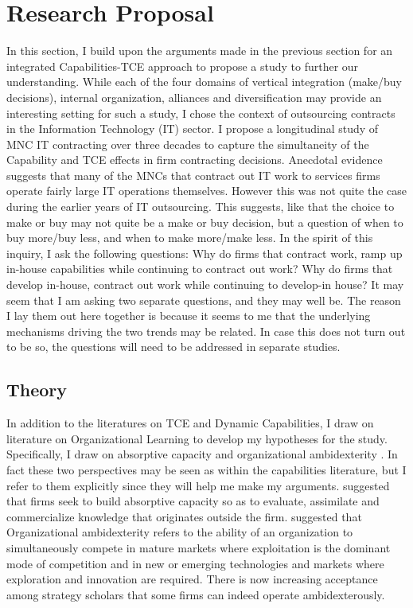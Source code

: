\documentclass[12pt,letterpaper]{article}
\begin{document}
\section{Research Proposal}
In this section, I build upon the arguments made in the previous section for an integrated Capabilities-TCE approach to propose a study to further our understanding. While each of the four domains of vertical integration (make/buy decisions), internal organization, alliances and diversification may provide an interesting setting for such a study, I chose the context of outsourcing contracts in the Information Technology (IT) sector. I propose a longitudinal study of MNC IT contracting over three decades to capture the simultaneity of the Capability and TCE effects in firm contracting decisions. Anecdotal evidence suggests that many of the MNCs that contract out IT work to services firms operate fairly large IT operations themselves. However this was not quite the case during the earlier years of IT outsourcing. This suggests, like \cite{Parmigiani2007} that the choice to make or buy may not quite be a make or buy decision, but a question of when to buy more/buy less, and when to make more/make less. In the spirit of this inquiry, I ask the following questions: Why do firms that contract work, ramp up in-house capabilities while continuing to contract out work? Why do firms that develop in-house, contract out work while continuing to develop-in house? It may seem that I am asking two separate questions, and they may well be. The reason I lay them out here together is because it seems to me that the underlying mechanisms driving the two trends may be related. In case this does not turn out to be so, the questions will need to be addressed in separate studies.

\subsection{Theory}
In addition to the literatures on TCE and Dynamic Capabilities, I draw on literature on Organizational Learning to develop my hypotheses for the study. Specifically, I draw on absorptive capacity \citep{Cohen1990} and organizational ambidexterity \citep{OReilly2004, OReilly2008, Raisch2008}. In fact these two perspectives may be seen as within the capabilities literature, but I refer to them explicitly since they will help me make my arguments. \cite{Cohen1990} suggested that firms seek to build absorptive capacity so as to evaluate, assimilate and commercialize knowledge that originates outside the firm.  \cite{OReilly2004, OReilly2008} suggested that Organizational ambidexterity refers to the ability of an organization to simultaneously compete in mature markets where exploitation is the dominant mode of competition and in new or emerging technologies and markets where exploration and innovation are required. There is now increasing acceptance among strategy scholars that some firms can indeed operate ambidexterously. 
\end{document}
